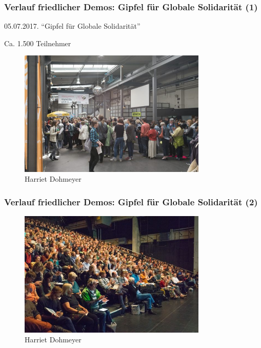 \documentclass[]{beamer}
\begin{document}
	\begin{frame}
	\frametitle{Verlauf friedlicher Demos: Gipfel für Globale Solidarität (1)}
		05.07.2017. \enquote{Gipfel für Globale Solidarität}\par
		Ca. 1.500 Teilnehmer
	\begin{figure}
		\renewcommand{\figurename}{Foto} 
		\includegraphics[width=0.8\textwidth]{images/gipfel-globale-solidaritaet-1}
		\caption{Harriet Dohmeyer}
	\end{figure}
\end{frame}

	\begin{frame}
	\frametitle{Verlauf friedlicher Demos: Gipfel für Globale Solidarität (2)}
	\begin{figure}
		\renewcommand{\figurename}{Foto} 
		\includegraphics[width=0.8\textwidth]{images/gipfel-globale-solidaritaet-2}
		\caption{Harriet Dohmeyer}
	\end{figure}
\end{frame}
\end{document}

